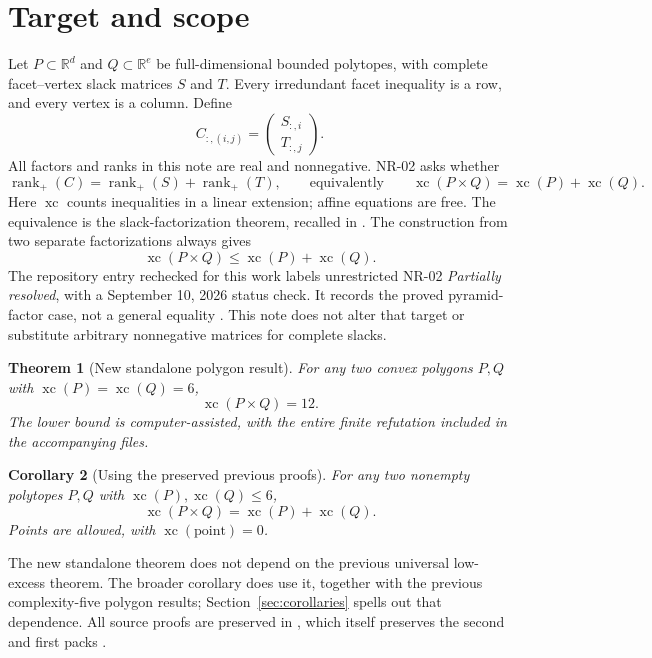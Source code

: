 \documentclass[11pt,a4paper]{article}
\newcommand{\xc}{\operatorname{xc}}
\newcommand{\rankp}{\operatorname{rank}_{+}}
\newcommand{\R}{\mathbb R}
\newtheorem{theorem}{Theorem}[section]
\newtheorem{corollary}[theorem]{Corollary}
\theoremstyle{definition}\newtheorem{definition}[theorem]{Definition}
\theoremstyle{remark}\newtheorem{remark}[theorem]{Remark}
\begin{document}
\section{Target and scope}
Let $P\subset\R^d$ and $Q\subset\R^e$ be full-dimensional bounded polytopes,
with complete facet--vertex slack matrices $S$ and $T$. Every irredundant facet
inequality is a row, and every vertex is a column. Define
\begin{equation}\label{eq:product}
 C_{:,(i,j)}=\begin{pmatrix}S_{:,i}\\T_{:,j}\end{pmatrix}.
\end{equation}
All factors and ranks in this note are real and nonnegative. NR-02 asks whether
\begin{equation}\label{eq:target}
 \rankp(C)=\rankp(S)+\rankp(T),
 \qquad\text{equivalently}\qquad
 \xc(P\times Q)=\xc(P)+\xc(Q).
\end{equation}
Here $\xc$ counts inequalities in a linear extension; affine equations are
free. The equivalence is the slack-factorization theorem, recalled in
\cite{twz}. The construction from two separate factorizations always gives
\begin{equation}\label{eq:upper}
 \xc(P\times Q)\le\xc(P)+\xc(Q).
\end{equation}
The repository entry rechecked for this work labels unrestricted NR-02
\emph{Partially resolved}, with a September 10, 2026 status check. It records
the proved pyramid-factor case, not a general equality \cite{repo,twz}.
This note does not alter that target or substitute arbitrary nonnegative
matrices for complete slacks.

\begin{theorem}[New standalone polygon result]\label{thm:main}
For any two convex polygons $P,Q$ with $\xc(P)=\xc(Q)=6$,
\[
 \boxed{\xc(P\times Q)=12.}
\]
The lower bound is computer-assisted, with the entire finite refutation
included in the accompanying files.
\end{theorem}

\begin{corollary}[Using the preserved previous proofs]\label{cor:small}
For any two nonempty polytopes $P,Q$ with $\xc(P),\xc(Q)\le6$,
\[
 \xc(P\times Q)=\xc(P)+\xc(Q).
\]
Points are allowed, with $\xc(\text{point})=0$.
\end{corollary}

The new standalone theorem does not depend on the previous universal
low-excess theorem. The broader corollary does use it, together with the
previous complexity-five polygon results; Section~\ref{sec:corollaries}
spells out that dependence. All source proofs are preserved in
, which itself preserves the
second and first packs \cite{round3,round2}.
\end{document}
